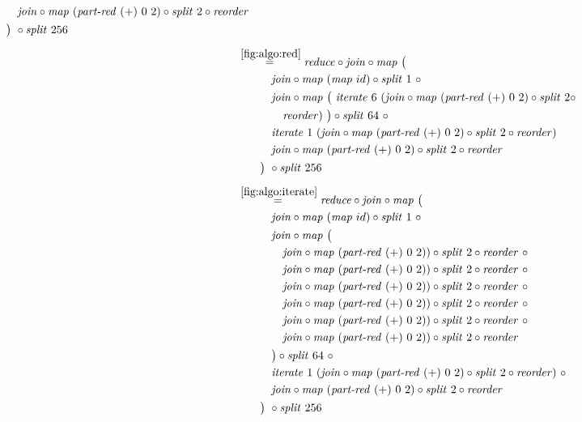 \begin{align*}
\begin{aligned}
    &\qquad\quad\join \circ \map\ (\partRed\ (+)\ 0\ 2) \circ \splitN\ 2\circ \reorder\\
    &\qquad\big)\ \circ \splitN\ 256
  \end{aligned}\\[.5em]
%
  &\hspace{-2em}\quad\begin{aligned}
    &\overset{\ref{fig:algo:red}}{=\hspace{.2em}}
      \reduce \circ \join \circ \map\ \big(\\
    &\qquad\quad\join \circ \map\ (\map\ id) \circ \splitN\ 1\ \circ\\
    &\qquad\quad\join \circ \map\ \big(\ \iterateN\ 6\ (\join \circ \map\ (\partRed\ (+)\ 0\ 2)\circ \splitN\ 2 \circ\\
    &\qquad\qquad\reorder)\ \big)\circ \splitN\ 64\ \circ\\
    &\qquad\quad\iterateN\ 1\ (\join \circ \map\ (\partRed\ (+)\ 0\ 2) \circ \splitN\ 2\circ \reorder)\\
    &\qquad\quad\join \circ \map\ (\partRed\ (+)\ 0\ 2) \circ \splitN\ 2\circ \reorder\\
    &\qquad\big)\ \circ \splitN\ 256
  \end{aligned}\\[.5em]
%
  &\hspace{-2em}\quad\begin{aligned}
    &\overset{\ref{fig:algo:iterate}}{=\hspace{.2em}}
      \reduce \circ \join \circ \map\ \big(\\
    &\qquad\quad\join \circ \map\ (\map\ id) \circ \splitN\ 1\ \circ\\
    &\qquad\quad\join \circ \map\ \big(\\
    &\qquad\qquad \join \circ \map\ (\partRed\ (+)\ 0\ 2))\circ \splitN\ 2 \circ \reorder\ \circ\\
    &\qquad\qquad \join \circ \map\ (\partRed\ (+)\ 0\ 2))\circ \splitN\ 2 \circ \reorder\ \circ\\
    &\qquad\qquad \join \circ \map\ (\partRed\ (+)\ 0\ 2))\circ \splitN\ 2 \circ \reorder\ \circ\\
    &\qquad\qquad \join \circ \map\ (\partRed\ (+)\ 0\ 2))\circ \splitN\ 2 \circ \reorder\ \circ\\
    &\qquad\qquad \join \circ \map\ (\partRed\ (+)\ 0\ 2))\circ \splitN\ 2 \circ \reorder\ \circ\\
    &\qquad\qquad \join \circ \map\ (\partRed\ (+)\ 0\ 2))\circ \splitN\ 2 \circ \reorder\\
    &\qquad\quad\big)\circ \splitN\ 64\ \circ\\
    &\qquad\quad\iterateN\ 1\ (\join \circ \map\ (\partRed\ (+)\ 0\ 2) \circ \splitN\ 2\circ \reorder)\ \circ\\
    &\qquad\quad\join \circ \map\ (\partRed\ (+)\ 0\ 2) \circ \splitN\ 2\circ \reorder\\
    &\qquad\big)\ \circ \splitN\ 256
  \end{aligned}\\[.5em]
%
\end{align*}

